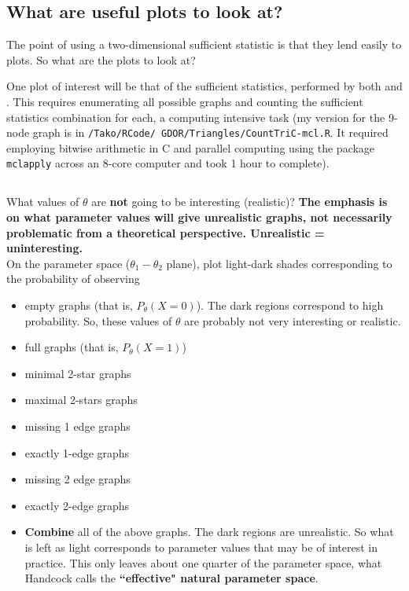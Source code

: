 \documentclass{amsbook}
\theoremstyle{definition}
\theoremstyle{remark}
\begin{document}
\subsection{What are useful plots to look at?}

The point of using a two-dimensional sufficient statistic is that they lend easily to 
plots.  So what are the plots to look at?

One plot of interest will be that of the sufficient statistics, performed by both 
\citet{Handcock:Degeneracy} and \citet{Rinaldo:2009}.  This requires enumerating all 
possible graphs and counting the sufficient statistics combination for each, a 
computing intensive task (my version for the 9-node graph is in \texttt{/Tako/RCode/
GDOR/Triangles/CountTriC-mcl.R}.  It required employing bitwise arithmetic in C and 
parallel computing using the package \texttt{mclapply} across an 8-core computer and 
took 1 hour to complete).


\subsection{\citet{Handcock:Degeneracy}}


What values of $\theta$ are \textbf{not} going to be interesting (realistic)?  \textbf
{The emphasis is on what parameter values will give unrealistic graphs, not necessarily 
problematic from a theoretical perspective.  Unrealistic = uninteresting.}  \\

On the parameter space ($\theta_1-\theta_2$ plane), plot light-dark shades 
corresponding to the probability of observing 
	\begin{itemize}
		\item empty graphs (that is, $P_\theta(X=0)$).  The dark regions correspond to 
high probability.  So, these values of $\theta$ are probably not very interesting or 
realistic.
		\item full graphs (that is, $P_\theta(X=1)$)
		\item minimal 2-star graphs
		\item maximal 2-stars graphs
		\item missing 1 edge graphs
		\item exactly 1-edge graphs
		\item missing 2 edge graphs
		\item exactly 2-edge graphs
		\item \textbf{Combine} all of the above graphs.  The dark regions are 
unrealistic.  So what is left as light corresponds to parameter values that may be of 
interest in practice.  This only leaves about one quarter of the parameter space, what 
Handcock calls the \textbf{``effective" natural parameter space}.
	\end{itemize}
	
\end{document}
